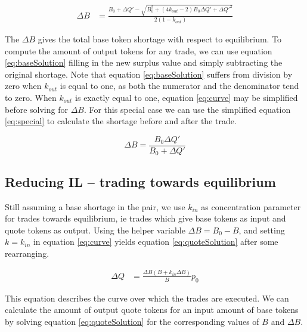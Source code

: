 \documentclass [10pt, twoside] {article}
\begin{document}
\begin{align} \label{eq:baseSolution}
	\Delta B &= \frac{B_0 + \Delta Q' - \sqrt{B_0^2 + \left(4k_{out}-2\right)B_0 \Delta Q' + \Delta Q'^2}}{2\left(1-k_{out}\right)}
\end{align}

The $\Delta B$ gives the total base token shortage with respect to equilibrium. To compute the amount of output tokens for any trade, we can use equation \ref{eq:baseSolution} filling in the new surplus value and simply subtracting the original shortage. Note that equation \ref{eq:baseSolution} suffers from division by zero when $k_{out}$ is equal to one, as both the numerator and the denominator tend to zero. When $k_{out}$ is exactly equal to one, equation \ref{eq:curve} may be simplified before solving for $\Delta B$. For this special case we can use the simplified equation \ref{eq:special} to calculate the shortage before and after the trade.

\begin{equation} \label{eq:special}
\Delta B = \frac{B_0 \Delta Q'}{B_0 + \Delta Q'}
\end{equation}

\subsection{Reducing IL -- trading towards equilibrium}
Still assuming a base shortage in the pair, we use $k_{in}$ as concentration parameter for trades towards equilibrium, ie trades which give base tokens as input and quote tokens as output. Using the helper variable $\Delta B = B_0 - B$, and setting $k = k_{in}$ in equation \ref{eq:curve} yields equation \ref{eq:quoteSolution} after some rearranging.

\begin{align} \label{eq:quoteSolution}
	\Delta Q  &= \frac{\Delta B \left(B + k_{in} \Delta B \right)}{B} p_0
\end{align}

This equation describes the curve over which the trades are executed. We can calculate the amount of output quote tokens for an input amount of base tokens by solving equation \ref{eq:quoteSolution} for the corresponding values of $B$ and $\Delta B$.
\end{document}

